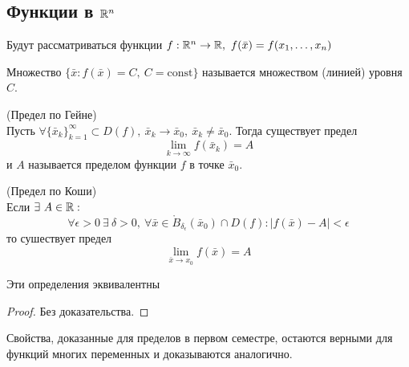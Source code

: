 \subsection{Функции в \texorpdfstring{$\mathbb{R}^n$}{Rn}}
Будут рассматриваться функции $f: \mathbb{R}^n\to \mathbb{R},\ f(\bar{x})=f(x_1, \dots, x_n)$
\begin{definition}
    Множество $\{\bar{x}: f(\bar{x})=C,\ C=\text{const}\}$ называется множеством (линией) уровня $C$.
\end{definition} 
\begin{definition} (Предел по Гейне)\\
    Пусть $\forall \{\bar{x}_k\}_{k=1}^{\infty}\subset D(f),\ \bar{x}_k\to \bar{x}_0,\ \bar{x}_k\ne \bar{x}_0$. Тогда существует предел
    \[\lim\limits_{k\to \infty}f(\bar{x}_k)=A\]
    и $A$ называется пределом функции $f$ в точке $\bar{x}_0$.
\end{definition} 
\begin{definition} (Предел по Коши)\\
    Если $\exists\ A\in \mathbb{R}:$
    \[\forall \epsilon>0\ \exists\ \delta>0,\ \forall \bar{x}\in \mathring{B}_{\delta_\epsilon}(\bar{x}_0)\cap D(f): |f(\bar{x})-A|<\epsilon\]
    то сушествует предел 
    \[\lim\limits_{\bar{x}\to x_0}f(\bar{x})=A\]
\end{definition} 
\begin{theorem}
    Эти определения эквивалентны
\end{theorem} 
\begin{proof}
    Без доказательства.
\end{proof} 
\begin{comm}
    Свойства, доказанные для пределов в первом семестре, остаются верными для функций многих переменных и доказываются аналогично.
\end{comm} 